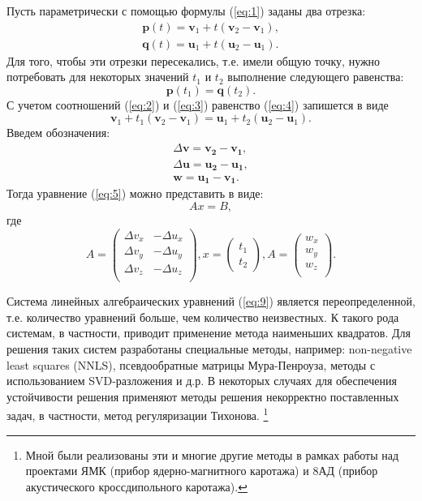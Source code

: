 \documentclass[11pt]{article} %
\begin{document}
Пусть параметрически с помощью формулы (\ref{eq:1}) заданы два отрезка:
\begin{eqnarray}
	\mathbf{p}\left(t\right) = \mathbf{v}_{1} + t\left(\mathbf{v}_{2} - \mathbf{v}_{1}\right), \label{eq:2} \\
	\mathbf{q}\left(t\right) = \mathbf{u}_{1} + t\left(\mathbf{u}_{2} - \mathbf{u}_{1}\right) \label{eq:3}. 
\end{eqnarray}
Для того, чтобы эти отрезки пересекались, т.е. имели общую точку, нужно потребовать для некоторых значений $t_{1}$ и $t_{2}$ выполнение следующего равенства:
\begin{equation}
	\mathbf{p}\left(t_{1}\right) = \mathbf{q}\left(t_{2}\right). \label{eq:4}
\end{equation}
С учетом соотношений (\ref{eq:2}) и (\ref{eq:3}) равенство (\ref{eq:4}) запишется в виде
\begin{equation}
	 \mathbf{v}_{1} + t_{1}\left(\mathbf{v}_{2} - \mathbf{v}_{1}\right) = 
	 \mathbf{u}_{1} + t_{2}\left(\mathbf{u}_{2} - \mathbf{u}_{1}\right). \label{eq:5}
\end{equation} 
Введем обозначения:
\begin{eqnarray} 
	\Delta \mathbf{v} = \mathbf{v_{2}} - \mathbf{v_{1}}, \label{eq:6}\\
	\Delta \mathbf{u} = \mathbf{u_{2}} - \mathbf{u_{1}}, \label{eq:7} \\
        \mathbf{w} = \mathbf{u_{1}} - \mathbf{v_{1}}. \label{eq:8}
\end{eqnarray}
Тогда уравнение (\ref{eq:5}) можно представить в виде:
\begin{equation}
	Ax=B, \label{eq:9}
\end{equation}
где
$$
	A = 
	\begin{pmatrix}
		\Delta v_{x} & -\Delta u_{x} \\
		\Delta v_{y} & -\Delta u_{y} \\
		\Delta v_{z} & -\Delta u_{z} \\				
	\end{pmatrix},
	x = 
	\begin{pmatrix}
	t_{1} \\ t_{2}
	\end{pmatrix},
	A = 
	\begin{pmatrix}
		w_{x}  \\
		w_{y}  \\
		w_{z}  \\				
	\end{pmatrix}.		
$$

Система линейных алгебраических уравнений (\ref{eq:9}) является переопределенной, т.е. количество уравнений больше, чем количество неизвестных. К такого рода системам, в частности, приводит применение метода наименьших квадратов. Для решения таких систем разработаны специальные методы, например: non-negative least squares (NNLS), псевдообратные 
матрицы Мура-Пенроуза, методы с использованием SVD-разложения и д.р. В некоторых случаях для обеспечения 
устойчивости решения применяют методы решения некорректно поставленных задач, в частности, метод регуляризации Тихонова. \footnote{Мной были реализованы эти и многие другие методы в рамках работы над проектами ЯМК (прибор ядерно-магнитного каротажа) и 8АД (прибор акустического кроссдипольного каротажа).}
\end{document}
